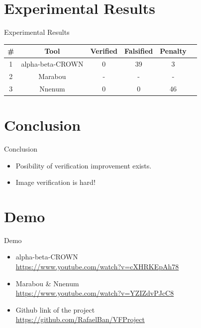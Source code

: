 \documentclass[9pt]{beamer}
\begin{document}
\section{Experimental Results}
\begin{frame}[plain,c]{Experimental Results}
\begin{center}
\begin{tabular}{ c c c c c c}
 \hline
 \textbf{\#} & \textbf{Tool} & \textbf{Verified} & \textbf{Falsified} & \textbf{Penalty}\\
 \hline
 1 & alpha-beta-CROWN & 0 & 39 & 3\\
 \hline
 2 & Marabou & - & - & -\\
 \hline
 3 & Nnenum & 0 & 0 & 46\\
 \hline
\end{tabular}
\end{center}
\end{frame}

\section{Conclusion}
\begin{frame}[plain,c]{Conclusion}
\begin{itemize}
    \item Posibility of verification improvement exists.
    \item Image verification is hard!
\end{itemize}
\end{frame}

\section{Demo}
\begin{frame}[plain,c]{Demo}
\begin{itemize}
    \item alpha-beta-CROWN\\
    \url{https://www.youtube.com/watch?v=cXHRKEpAh78}
    \item Marabou \& Nnenum\\
    \url{https://www.youtube.com/watch?v=YZIZdvPJcC8}
    \item Github link of the project\\
    \url{https://github.com/RafaelBan/VFProject}
\end{itemize}
\end{frame}
\end{document}
